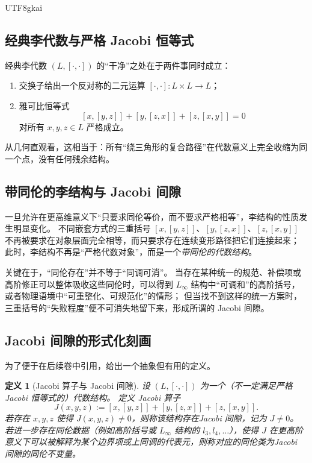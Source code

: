 \documentclass[12pt]{article}
\newtheorem{definition}{定义}[section]
\begin{document}
\begin{CJK*}{UTF8}{gkai}
\subsection{经典李代数与严格 Jacobi 恒等式}

经典李代数 $(L,[\cdot,\cdot])$ 的“干净”之处在于两件事同时成立：
\begin{enumerate}
  \item 交换子给出一个反对称的二元运算 $[\cdot,\cdot]\colon L\times L\to L$；
  \item 雅可比恒等式
  \[
    [x,[y,z]]+[y,[z,x]]+[z,[x,y]]=0
  \]
  对所有 $x,y,z\in L$ 严格成立。
\end{enumerate}

从几何直观看，这相当于：所有“绕三角形的复合路径”在代数意义上完全收缩为同一个点，没有任何残余结构。

\subsection{带同伦的李结构与 Jacobi 间隙}

一旦允许在更高维意义下“只要求同伦等价，而不要求严格相等”，李结构的性质发生明显变化。
不同嵌套方式的三重括号 $[x,[y,z]]$、$[y,[z,x]]$、$[z,[x,y]]$ 不再被要求在对象层面完全相等，而只要求存在连续变形路径把它们连接起来；
此时，李结构不再是“严格代数对象”，而是一个\emph{带同伦的代数结构}。

关键在于，“同伦存在”并不等于“同调可消”。
当存在某种统一的规范、补偿项或高阶修正可以整体吸收这些同伦时，可以得到 $L_\infty$ 结构中“可调和”的高阶括号，或者物理语境中“可重整化、可规范化”的情形；
但当找不到这样的统一方案时，三重括号的“失败程度”便不可消失地留下来，形成所谓的 Jacobi 间隙。

\subsection{Jacobi 间隙的形式化刻画}

为了便于在后续卷中引用，给出一个抽象但有用的定义。

\begin{definition}[Jacobi 算子与 Jacobi 间隙]
设 $(L,[\cdot,\cdot])$ 为一个（不一定满足严格 Jacobi 恒等式的）代数结构。
定义 Jacobi 算子
\[
  J(x,y,z) := [x,[y,z]]+[y,[z,x]]+[z,[x,y]].
\]
若存在 $x,y,z$ 使得 $J(x,y,z)\neq 0$，则称该结构存在\emph{Jacobi 间隙}，记为 $J\neq 0$。
若进一步存在同伦数据（例如高阶括号或 $L_\infty$ 结构的 $l_3,l_4,\dots$），使得 $J$ 在更高阶意义下可以被解释为某个边界项或上同调的代表元，则称对应的同伦类为\emph{Jacobi 间隙的同伦不变量}。
\end{definition}


\end{CJK*}
\end{document}
